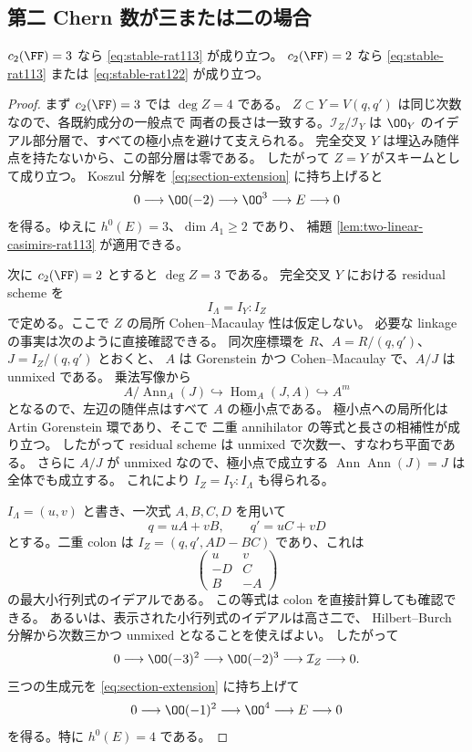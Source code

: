 \subsection{第二 Chern 数が三または二の場合}

\begin{proposition}
\label{prop:chern-two-three}
$c_2(\FF)=3$ なら \eqref{eq:stable-rat113} が成り立つ。
$c_2(\FF)=2$ なら \eqref{eq:stable-rat113} または
\eqref{eq:stable-rat122} が成り立つ。
\end{proposition}

\begin{proof}
まず $c_2(\FF)=3$ では $\deg Z=4$ である。
$Z\subset Y=V(q,q')$ は同じ次数なので、各既約成分の一般点で
両者の長さは一致する。$\mathcal I_Z/\mathcal I_Y$ は
$\OO_Y$ のイデアル部分層で、すべての極小点を避けて支えられる。
完全交叉 $Y$ は埋込み随伴点を持たないから、この部分層は零である。
したがって $Z=Y$ がスキームとして成り立つ。
Koszul 分解を \eqref{eq:section-extension} に持ち上げると
\[
 0\longrightarrow\OO(-2)\longrightarrow\OO^3
 \longrightarrow E\longrightarrow0
\]
を得る。ゆえに $h^0(E)=3$、$\dim A_1\geq2$ であり、
補題 \ref{lem:two-linear-casimirs-rat113} が適用できる。

次に $c_2(\FF)=2$ とすると $\deg Z=3$ である。
完全交叉 $Y$ における residual scheme を
\[
 I_\Lambda=I_Y:I_Z
\]
で定める。ここで $Z$ の局所 Cohen--Macaulay 性は仮定しない。
必要な linkage の事実は次のように直接確認できる。
同次座標環を $R$、$A=R/(q,q')$、$J=I_Z/(q,q')$ とおくと、
$A$ は Gorenstein かつ Cohen--Macaulay で、$A/J$ は unmixed である。
乗法写像から
\[
 A/\operatorname{Ann}_A(J)
 \hookrightarrow\operatorname{Hom}_A(J,A)\hookrightarrow A^m
\]
となるので、左辺の随伴点はすべて $A$ の極小点である。
極小点への局所化は Artin Gorenstein 環であり、そこで
二重 annihilator の等式と長さの相補性が成り立つ。
したがって residual scheme は unmixed で次数一、すなわち平面である。
さらに $A/J$ が unmixed なので、極小点で成立する
$\operatorname{Ann}\operatorname{Ann}(J)=J$ は全体でも成立する。
これにより $I_Z=I_Y:I_\Lambda$ も得られる。

$I_\Lambda=(u,v)$ と書き、一次式 $A,B,C,D$ を用いて
\[
 q=uA+vB,\qquad q'=uC+vD
\]
とする。二重 colon は
$I_Z=(q,q',AD-BC)$ であり、これは
\[
 \begin{pmatrix}u&v\\-D&C\\B&-A\end{pmatrix}
\]
の最大小行列式のイデアルである。
この等式は colon を直接計算しても確認できる。
あるいは、表示された小行列式のイデアルは高さ二で、
Hilbert--Burch 分解から次数三かつ unmixed となることを使えばよい。
したがって
\[
 0\longrightarrow\OO(-3)^2\longrightarrow\OO(-2)^3
 \longrightarrow\mathcal I_Z\longrightarrow0.
\]
三つの生成元を \eqref{eq:section-extension} に持ち上げて
\begin{equation}
 0\longrightarrow\OO(-1)^2\longrightarrow\OO^4
 \longrightarrow E\longrightarrow0
 \label{eq:steiner-E}
\end{equation}
を得る。特に $h^0(E)=4$ である。


\end{proof}
